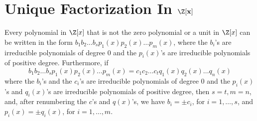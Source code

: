 \section{Unique Factorization In $\mathbf{\Z[x]}$}

\begin{theorem}
	Every polynomial in $\Z[x]$ that is not the zero polynomial or a unit in $\Z[x]$ can be written in the form $b_1b_2\dots b_sp_1(x)p_2(x)\dots p_m(x)$, where the $b_i$'s are irreducible polynomials of degree 0 and the $p_i(x)$'s are irreducible polynomials of positive degree. Furthermore, if
	\[ b_1b_2\dots b_sp_1(x)p_2(x) \dots p_m(x) = c_1c_2 \dots c_tq_1(x) q_2(x) \dots q_n(x) \]
	\noindent where the $b_i$'s and the $c_i$'s are irreducible polynomials of degree 0 and the $p_i(x)$'s and $q_i(x)$'s are irreducible polynomials of positive degree, then $s=t, m=n$, and, after renumbering the $c$'s and $q(x)$'s, we have $b_i = \pm c_i$, for $i=1, \dots, s$, and $p_i(x)= \pm q_i(x)$, for $i = 1, \dots, m$.
\end{theorem}
